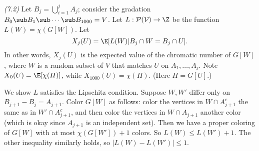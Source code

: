 \begin{problem} {\it (7.2)}
Let $B_j=\bigcup_{i=1}^j A_j$; consider the gradation $B_0\sub B_1\sub\cdots\sub B_{1000}=V$. Let $L:\cal P(V)\to \Z$ be the function $L(W)=\chi(G[W])$. Let 
\[
X_j(U)=\E[L(W)|B_j\cap W=B_j\cap U].
\]
In other words, $X_j(U)$ is the expected value of the chromatic number of $G[W]$, where $W$ is a random subset of $V$ that matches $U$ on $A_1,\ldots, A_j$. Note $X_0(U)=\E[\chi(H)]$, while $X_{1000}(U)=\chi(H)$. (Here $H=G[U]$.)

We show $L$ satisfies the Lipschitz condition. Suppose $W,W'$ differ only on $B_{j+1}-B_j=A_{j+1}$. Color $G[W]$ as follows: color the vertices in $W\cap A_{j+1}^c$ the same as in $W'\cap A_{j+1}^c$, and then color the vertices in $W\cap A_{j+1}$ another color (which is okay since $A_{j+1}$ is an independent set). Then we have a proper coloring of $G[W]$ with at most $\chi(G[W'])+1$ colors. So $L(W)\le L(W')+1$. The other inequality similarly holds, so $|L(W)-L(W')|\le 1$.


\end{problem}
